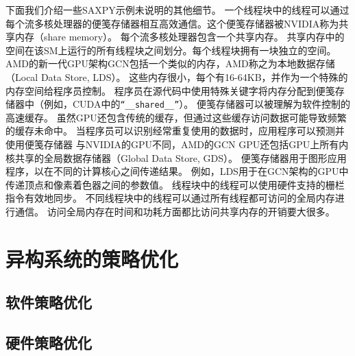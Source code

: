 下面我们介绍一些SAXPY示例未说明的其他细节。
一个线程块中的线程可以通过每个流多核处理器的便笺存储器相互高效通信。这个便笺存储器被NVIDIA称为共享内存（share memory）。
每个流多核处理器包含一个共享内存。
共享内存中的空间在该SM上运行的所有线程块之间划分。每个线程块拥有一块独立的空间。
AMD的新一代GPU架构GCN包括一个类似的内存，AMD称之为本地数据存储（Local Data Store, LDS）。
这些内存很小，每个有16-64KB，并作为一个特殊的内存空间给程序员控制。
程序员在源代码中使用特殊关键字将内存分配到便笺存储器中（例如，CUDA中的\texttt{“__shared__”}）。
便笺存储器可以被理解为软件控制的高速缓存。
虽然GPU还包含传统的缓存，但通过这些缓存访问数据可能导致频繁的缓存未命中。
当程序员可以识别经常重复使用的数据时，应用程序可以预测并使用便笺存储器
与NVIDIA的GPU不同，AMD的GCN GPU还包括GPU上所有内核共享的全局数据存储器（Global Data Store, GDS）。
便笺存储器用于图形应用程序，以在不同的计算核心之间传递结果。
例如，LDS用于在GCN架构的GPU中传递顶点和像素着色器之间的参数值。
线程块中的线程可以使用硬件支持的栅栏指令有效地同步。 
不同线程块中的线程可以通过所有线程都可访问的全局内存进行通信。 
访问全局内存在时间和功耗方面都比访问共享内存的开销要大很多。



\section{异构系统的策略优化}

\subsection{软件策略优化}

\subsection{硬件策略优化}



















